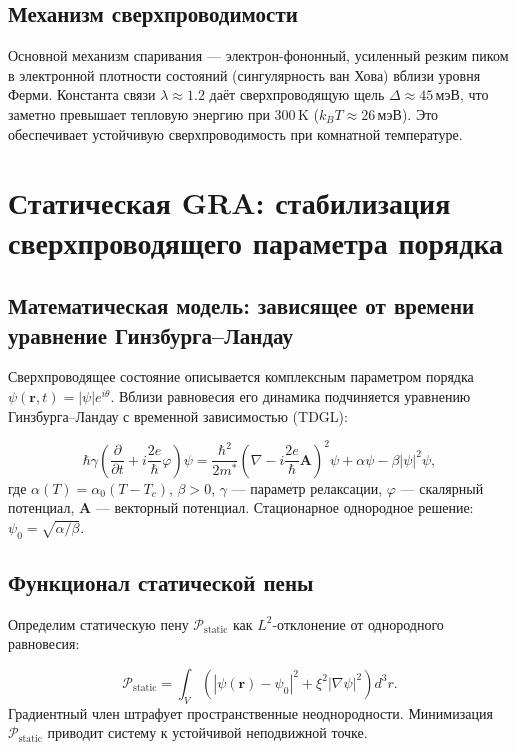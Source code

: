 \documentclass[12pt,a4paper]{article}
\numberwithin{equation}{section}
\begin{document}
\subsection{Механизм сверхпроводимости}

Основной механизм спаривания — электрон-фононный, усиленный резким пиком в электронной плотности состояний (сингулярность ван Хова) вблизи уровня Ферми. Константа связи $\lambda \approx 1.2$ даёт сверхпроводящую щель $\Delta \approx 45$\,мэВ, что заметно превышает тепловую энергию при 300\,K ($k_B T \approx 26$\,мэВ). Это обеспечивает устойчивую сверхпроводимость при комнатной температуре.

\section{Статическая GRA: стабилизация сверхпроводящего параметра порядка}
\label{sec:static}

\subsection{Математическая модель: зависящее от времени уравнение Гинзбурга--Ландау}

Сверхпроводящее состояние описывается комплексным параметром порядка $\psi(\mathbf{r}, t) = |\psi| e^{i\theta}$. Вблизи равновесия его динамика подчиняется уравнению Гинзбурга--Ландау с временной зависимостью (TDGL):

\begin{equation}
\hbar \gamma \left( \frac{\partial}{\partial t} + i \frac{2e}{\hbar} \varphi \right) \psi = \frac{\hbar^2}{2m^*} \left( \nabla - i \frac{2e}{\hbar} \mathbf{A} \right)^2 \psi + \alpha \psi - \beta |\psi|^2 \psi,
\label{eq:TDGL}
\end{equation}
где $\alpha(T) = \alpha_0 (T - T_c)$, $\beta > 0$, $\gamma$ — параметр релаксации, $\varphi$ — скалярный потенциал, $\mathbf{A}$ — векторный потенциал. Стационарное однородное решение: $\psi_0 = \sqrt{\alpha/\beta}$.

\subsection{Функционал статической пены}

Определим статическую пену $\mathcal{P}_{\text{static}}$ как $L^2$-отклонение от однородного равновесия:

\begin{equation}
\mathcal{P}_{\text{static}} = \int_V \left( |\psi(\mathbf{r}) - \psi_0|^2 + \xi^2 |\nabla \psi|^2 \right) d^3 r.
\label{eq:Pstatic}
\end{equation}
Градиентный член штрафует пространственные неоднородности. Минимизация $\mathcal{P}_{\text{static}}$ приводит систему к устойчивой неподвижной точке.
\end{document}

